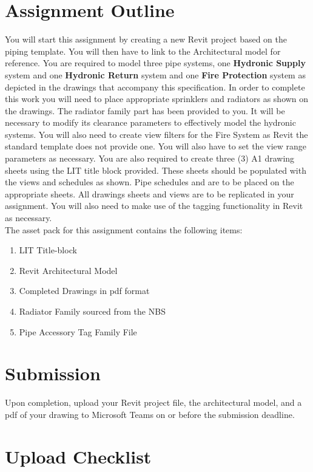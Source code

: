 \section*{Assignment Outline}
You will start this assignment by creating a new Revit project based on the piping template. You will then have to link to the Architectural model for reference.  You are required to model three pipe systems, one \textbf{Hydronic Supply} system and one \textbf{Hydronic Return} system and one \textbf{Fire Protection} system as depicted in the drawings that accompany this specification. In order to complete this work you will need to place appropriate sprinklers and radiators as shown on the drawings. The radiator family part has been provided to you. It will be necessary to modify its clearance parameters to effectively model the hydronic systems.  You will also need to create view filters for the Fire System as Revit the standard template does not provide one. You will also have to set the view range parameters as necessary.  You are also required to create three (3) A1 drawing sheets using the LIT title block provided. These sheets should be populated with the views and schedules as shown.  Pipe schedules and are to be placed on the appropriate sheets. All drawings sheets and views are to be replicated in your assignment. You will also need to make use of the tagging functionality in Revit as necessary.\\

The asset pack for this assignment contains the following items:
\begin{enumerate}
	\item LIT Title-block
	\item Revit Architectural Model
	\item Completed Drawings in pdf format
	\item Radiator Family sourced from the NBS
	\item Pipe Accessory Tag Family File
\end{enumerate}


\section*{Submission}
Upon completion, upload your Revit project file, the architectural model, and a pdf of your drawing to Microsoft Teams on or before the submission deadline.

\section*{Upload Checklist}

